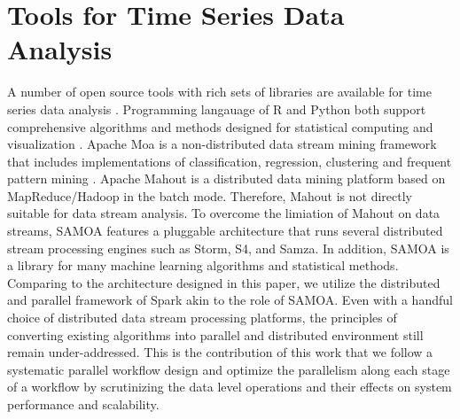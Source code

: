 \section{Tools for Time Series Data Analysis}		
A number of open source tools with rich sets of libraries are available for time series
 data analysis \cite{ahmed2010empirical}
\cite{kalpakis2001distance}
\cite{aghabozorgi2015time}
\cite{montero2014tsclust}.
Programming langauage of R and Python both support comprehensive algorithms and methods designed for statistical computing
and visualization \cite{team2013r}. Apache Moa is a non-distributed data stream mining framework that includes implementations of classification, regression, clustering and
frequent pattern mining \cite{bifet2010moa}. Apache Mahout is a distributed data mining platform based on MapReduce/Hadoop\cite{owen2012mahout} in the batch mode. Therefore, Mahout is not directly suitable for data stream analysis. To overcome the limiation of Mahout on data streams, SAMOA \cite{samoa} features a pluggable architecture that runs several distributed stream processing engines such as Storm, S4, and Samza. In addition, SAMOA is a library for many machine learning algorithms and statistical methods. Comparing to the architecture designed in this paper, we utilize the distributed and parallel framework of Spark akin to the role of SAMOA. Even with a handful choice of distributed data stream processing platforms, the principles  of converting existing algorithms into parallel and distributed environment still remain under-addressed. This is the contribution of this work that we follow a systematic parallel workflow design and optimize the parallelism along each stage of a workflow by scrutinizing the data level operations and their effects on system performance and scalability. 

